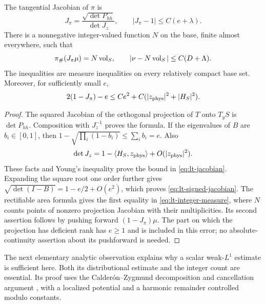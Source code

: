 \begin{lemma}\label{lt:jacobian}
The tangential Jacobian of $\pi$ is
\begin{equation}\label{eq:lt-jacobian}
 J_\pi=\frac{\sqrt{\det P_{hh}}}{\det J_z},\qquad
 |J_\pi-1|\le C(e+\lambda).
\end{equation}
There is a nonnegative integer-valued function $N$ on the base, finite
almost everywhere, such that
\begin{equation}\label{eq:lt-integer-measure}
 \pi_\#(J_\pi\mu)=N\operatorname{vol}_S,
 \qquad |\nu-N\operatorname{vol}_S|\le C(D+\Lambda).
\end{equation}
The inequalities are measure inequalities on every relatively compact base
set.  Moreover, for sufficiently small $e$,
\begin{equation}\label{eq:lt-signed-jacobian}
 2(1-J_\pi)-e\le Ce^2+C(|z_{\rm phys}|^2+|H_S|^2).
\end{equation}
\end{lemma}

\begin{proof}
The squared Jacobian of the orthogonal projection of $T$ onto $T_yS$ is
$\det P_{hh}$.  Composition with $J_z^{-1}$ proves the formula.  If the
eigenvalues of $B$ are $b_i\in[0,1]$, then
$1-\sqrt{\prod_i(1-b_i)}\le\sum_i b_i=e$.
Also
\[
 \det J_z=1-\langle H_S,z_{\rm phys}\rangle+O(|z_{\rm phys}|^2).
\]
These facts and Young's inequality prove the bound in
\eqref{eq:lt-jacobian}.  Expanding the square root one order further gives
$\sqrt{\det(I-B)}=1-e/2+O(e^2)$, which proves
\eqref{eq:lt-signed-jacobian}.  The rectifiable area formula
\cite[Chapter~3, equation~(2.5)]{Simon2018} gives the first equality in
\eqref{eq:lt-integer-measure}, where $N$ counts points of nonzero projection
Jacobian with their multiplicities.  Its second assertion follows by pushing
forward $(1-J_\pi)\mu$.  The part on which the projection has deficient rank
has $e\ge1$ and is included in this error; no absolute-continuity assertion
about its pushforward is needed.
\end{proof}

The next elementary analytic observation explains why a scalar
weak-$L^1$ estimate is sufficient here.  Both its distributional estimate and
the integer count are essential. Its proof uses the Calder\'on--Zygmund
decomposition and cancellation argument
\cite[Chapter~I, Lemmas~1--2]{CalderonZygmund1952}, with a localized
potential and a harmonic remainder controlled modulo constants.

